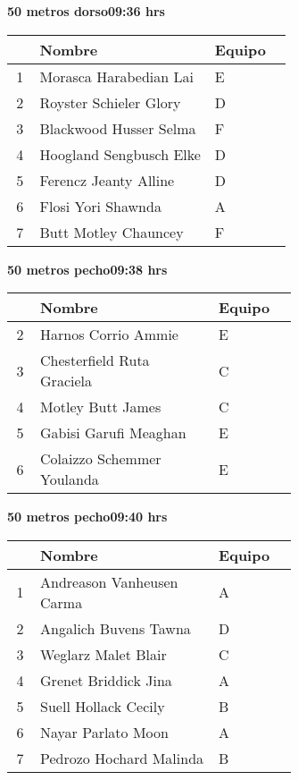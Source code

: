 \begin{minipage}{0.95\linewidth}
\begin{center}
\textbf{
50 metros dorso\hspace{1cm}09:36 hrs}
\end{center}
\begin{tabular}{cp{0.63\linewidth}l}
\hline
& \textbf{Nombre} & \textbf{Equipo} \\ \hline
1 & Morasca Harabedian Lai & E \\ 
2 & Royster Schieler Glory & D \\ 
3 & Blackwood Husser Selma & F \\ 
4 & Hoogland Sengbusch Elke & D \\ 
5 & Ferencz Jeanty Alline & D \\ 
6 & Flosi Yori Shawnda & A \\ 
7 & Butt Motley Chauncey & F \\ 
\end{tabular}
\end{minipage}
\begin{minipage}{0.95\linewidth}
\begin{center}
\textbf{
50 metros pecho\hspace{1cm}09:38 hrs}
\end{center}
\begin{tabular}{cp{0.63\linewidth}l}
\hline
& \textbf{Nombre} & \textbf{Equipo} \\ \hline
2 & Harnos Corrio Ammie & E \\ 
3 & Chesterfield Ruta Graciela & C \\ 
4 & Motley Butt James & C \\ 
5 & Gabisi Garufi Meaghan & E \\ 
6 & Colaizzo Schemmer Youlanda & E \\ 
\end{tabular}
\end{minipage}
\begin{minipage}{0.95\linewidth}
\begin{center}
\textbf{
50 metros pecho\hspace{1cm}09:40 hrs}
\end{center}
\begin{tabular}{cp{0.63\linewidth}l}
\hline
& \textbf{Nombre} & \textbf{Equipo} \\ \hline
1 & Andreason Vanheusen Carma & A \\ 
2 & Angalich Buvens Tawna & D \\ 
3 & Weglarz Malet Blair & C \\ 
4 & Grenet Briddick Jina & A \\ 
5 & Suell Hollack Cecily & B \\ 
6 & Nayar Parlato Moon & A \\ 
7 & Pedrozo Hochard Malinda & B \\ 
\end{tabular}
\end{minipage}
